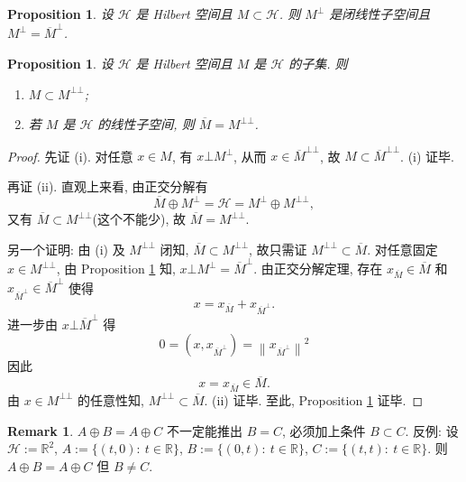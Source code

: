 \documentclass[a4paper,11pt]{article}
\newtheorem{proposition}[theorem]{Proposition}
\theoremstyle{definition}
\newtheorem{remark}[theorem]{Remark}
\begin{document}
\begin{CJK*}{UTF8}{gbsn}
\begin{proposition} \label{1}
    设 $ \mathcal{H} $ 是 Hilbert 空间且 $ M \subset \mathcal{H} $. 
    则 $ M^\bot $ 是闭线性子空间且 $ M^\bot = \overline{M}^\bot $.
\end{proposition}

\begin{proposition} \label{2}
    设 $ \mathcal{H} $ 是 Hilbert 空间且 $ M $ 是 $ \mathcal{H} $ 的子集. 则
    \begin{enumerate}[{\rm(i)}]
        \item $ M \subset M^{\bot \bot} $;
        \item 若 $ M $ 是 $ \mathcal{H} $ 的线性子空间, 则 $ \overline{M} = M^{\bot \bot} $.
    \end{enumerate}
\end{proposition}

\begin{proof}
    先证 (i). 对任意 $ x \in M $, 有 
    $ x \bot M^\bot $, 从而 $ x \in \overline{M}^{\bot \bot} $,
    故 $ M \subset \overline{M}^{\bot \bot} $. (i) 证毕.
    
    再证 (ii). 直观上来看, 由正交分解有
    $$
        \overline{M} \oplus M^\bot = \mathcal{H} = M^\bot \oplus M^{\bot \bot},
    $$
    又有 $ \overline{M} \subset M^{\bot \bot} $(这个不能少), 故 $ \overline{M} = M^{\bot \bot} $.
    
    另一个证明: 由 (i) 及 $ M^{\bot \bot} $ 闭知, $ \overline{M} \subset M^{\bot \bot} $,
    故只需证 $ M^{\bot \bot} \subset \overline{M} $. 
    对任意固定 $ x \in M^{\bot \bot} $,
    由 Proposition \ref{1} 知, $ x \bot M^\bot = \overline{M}^\bot $. 由正交分解定理,
    存在 $ x_{\overline{M}} \in \overline{M} $ 和 $ x_{\overline{M}^\bot} \in \overline{M}^\bot $ 
    使得 
    $$ 
        x = x_{\overline{M}} + x_{\overline{M}^\bot}. 
    $$
    进一步由 $ x \bot \overline{M}^\bot $ 得
    $$
        0 = \left( x, x_{\overline{M}^\bot} \right)  = \left\|  x_{\overline{M}^\bot} \right\|^2
    $$
    因此
    $$
        x = x_{\overline{M}} \in \overline{M}.
    $$
    由 $ x \in M^{\bot \bot} $ 的任意性知, $ M^{\bot \bot} \subset \overline{M} $. (ii) 证毕.
    至此, Proposition \ref{2} 证毕.
\end{proof}

\begin{remark}
    $ A \oplus B = A \oplus C $ 不一定能推出 $ B = C $, 必须加上条件 $ B \subset C $.
    反例: 设 $ \mathcal{H} := \mathbb{R}^2 $, 
    $ A := \{ (t, 0) :\ t \in \mathbb{R} \} $,
    $ B := \{ (0, t) :\ t \in \mathbb{R} \} $,
    $ C := \{ (t, t) :\ t \in \mathbb{R} \} $.
    则 $ A \oplus B = A \oplus C $ 但 $ B \neq C $.
\end{remark}


\end{CJK*}
\end{document}
